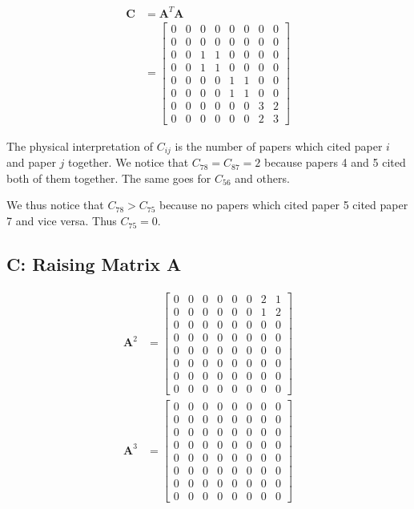 \documentclass[]{article}
\begin{document}
\begin{align*}
	\mathbf{C} &= \mathbf{A}^T\mathbf{A} \\
		&= \begin{bmatrix}
			0 & 0 & 0 & 0 & 0 & 0 & 0 & 0 \\
			0 & 0 & 0 & 0 & 0 & 0 & 0 & 0 \\
			0 & 0 & 1 & 1 & 0 & 0 & 0 & 0 \\
			0 & 0 & 1 & 1 & 0 & 0 & 0 & 0 \\
			0 & 0 & 0 & 0 & 1 & 1 & 0 & 0 \\
			0 & 0 & 0 & 0 & 1 & 1 & 0 & 0 \\
			0 & 0 & 0 & 0 & 0 & 0 & 3 & 2 \\
			0 & 0 & 0 & 0 & 0 & 0 & 2 & 3
		\end{bmatrix}
\end{align*}

The physical interpretation of $C_{ij}$ is the number of papers which cited paper $i$ and paper $j$ together. We notice that $C_{78} = C_{87} = 2$ because papers 4 and 5 cited both of them together. The same goes for $C_{56}$ and others.

We thus notice that $C_{78} > C_{75}$ because no papers which cited paper 5 cited paper 7 and vice versa. Thus $C_{75} = 0$.

\subsection*{C: Raising Matrix A}

\begin{align*}
	\mathbf{A}^2 &= \begin{bmatrix}
		0 & 0 & 0 & 0 & 0 & 0 & 2 & 1 \\
		0 & 0 & 0 & 0 & 0 & 0 & 1 & 2 \\
		0 & 0 & 0 & 0 & 0 & 0 & 0 & 0 \\
		0 & 0 & 0 & 0 & 0 & 0 & 0 & 0 \\
		0 & 0 & 0 & 0 & 0 & 0 & 0 & 0 \\
		0 & 0 & 0 & 0 & 0 & 0 & 0 & 0 \\
		0 & 0 & 0 & 0 & 0 & 0 & 0 & 0 \\
		0 & 0 & 0 & 0 & 0 & 0 & 0 & 0
	\end{bmatrix} \\
	\mathbf{A}^3 &= \begin{bmatrix}
		0 & 0 & 0 & 0 & 0 & 0 & 0 & 0 \\
		0 & 0 & 0 & 0 & 0 & 0 & 0 & 0 \\
		0 & 0 & 0 & 0 & 0 & 0 & 0 & 0 \\
		0 & 0 & 0 & 0 & 0 & 0 & 0 & 0 \\
		0 & 0 & 0 & 0 & 0 & 0 & 0 & 0 \\
		0 & 0 & 0 & 0 & 0 & 0 & 0 & 0 \\
		0 & 0 & 0 & 0 & 0 & 0 & 0 & 0 \\
		0 & 0 & 0 & 0 & 0 & 0 & 0 & 0
	\end{bmatrix}
\end{align*}
\end{document}
